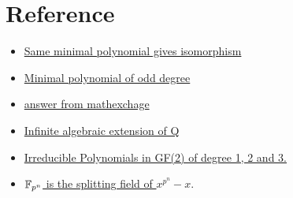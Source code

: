 \section{Reference}
\begin{itemize}
    \item \href{https://math.stackexchange.com/questions/4314565/same-minimal-polynomial-gives-isomorphism}{Same minimal polynomial gives isomorphism}
    \item \href{https://math.stackexchange.com/questions/762460/minimal-polynomial-of-odd-degree}{Minimal polynomial of odd degree}
    \item \href{https://math.stackexchange.com/questions/113689/proving-that-left-mathbb-q-sqrt-p-1-dots-sqrt-p-n-mathbb-q-right-2n-f}{answer from mathexchage}
    \item \href{https://math.stackexchange.com/questions/925793/infinite-algebraic-extension-of-mathbbq}{Infinite algebraic extension of Q}
    \item \href{https://www.youtube.com/watch?v=sc9grztQClc}{Irreducible Polynomials in GF(2) of degree 1, 2 and 3.}
    \item \href{https://sites.math.washington.edu//~julia/teaching/505_Winter2010/notes.pdf}{$\mathbb{F}_{p^n}$ is the splitting field of $x^{p^n}-x$}.
\end{itemize}